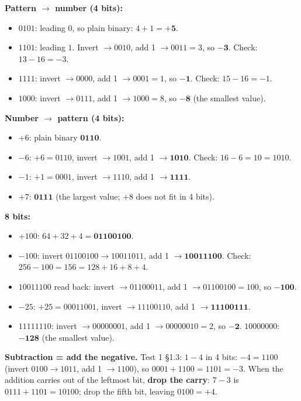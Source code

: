 \documentclass{fkt-notes}
\begin{document}
\noindent\textbf{Pattern $\to$ number (4 bits):}
\begin{itemize}[nosep]
  \item $0101$: leading $0$, so plain binary: $4+1=\mathbf{+5}$.
  \item $1101$: leading $1$. Invert $\to0010$, add 1 $\to0011=3$, so $\mathbf{-3}$. Check: $13-16=-3$. \checkmark
  \item $1111$: invert $\to0000$, add 1 $\to0001=1$, so $\mathbf{-1}$. Check: $15-16=-1$. \checkmark
  \item $1000$: invert $\to0111$, add 1 $\to1000=8$, so $\mathbf{-8}$ (the smallest value).
\end{itemize}
\noindent\textbf{Number $\to$ pattern (4 bits):}
\begin{itemize}[nosep]
  \item $+6$: plain binary $\mathbf{0110}$.
  \item $-6$: $+6=0110$, invert $\to1001$, add 1 $\to\mathbf{1010}$. Check: $16-6=10=1010$. \checkmark
  \item $-1$: $+1=0001$, invert $\to1110$, add 1 $\to\mathbf{1111}$.
  \item $+7$: $\mathbf{0111}$ (the largest value; $+8$ does not fit in 4 bits).
\end{itemize}
\noindent\textbf{8 bits:}
\begin{itemize}[nosep]
  \item $+100$: $64+32+4=\mathbf{01100100}$.
  \item $-100$: invert $01100100\to10011011$, add 1 $\to\mathbf{10011100}$. Check: $256-100=156=128+16+8+4$. \checkmark
  \item $10011100$ read back: invert $\to01100011$, add 1 $\to01100100=100$, so $\mathbf{-100}$.
  \item $-25$: $+25=00011001$, invert $\to11100110$, add 1 $\to\mathbf{11100111}$.
  \item $11111110$: invert $\to00000001$, add 1 $\to00000010=2$, so $\mathbf{-2}$.\quad
        $10000000$: $\mathbf{-128}$ (the smallest value).
\end{itemize}

\textbf{Subtraction = add the negative.} Test 1 \S1.3: $1-4$ in 4 bits:
$-4=1100$ (invert $0100\to1011$, add 1 $\to1100$), so
$0001+1100=1101=-3$.
When the addition carries out of the leftmost bit, \textbf{drop the carry}: $7-3$ is
$0111+1101=10100$; drop the fifth bit, leaving $0100=+4$.
\end{document}
